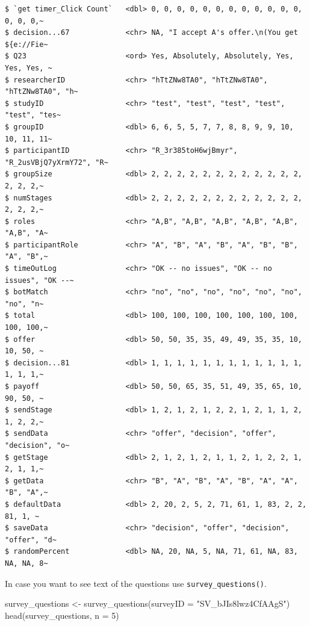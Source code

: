 \documentclass[
  letterpaper,
]{book}
\newenvironment{Shaded}{\begin{snugshade}}{\end{snugshade}}
\newcommand{\AttributeTok}[1]{\textcolor[rgb]{0.40,0.45,0.13}{#1}}
\newcommand{\DecValTok}[1]{\textcolor[rgb]{0.68,0.00,0.00}{#1}}
\newcommand{\FunctionTok}[1]{\textcolor[rgb]{0.28,0.35,0.67}{#1}}
\newcommand{\NormalTok}[1]{\textcolor[rgb]{0.00,0.23,0.31}{#1}}
\newcommand{\OtherTok}[1]{\textcolor[rgb]{0.00,0.23,0.31}{#1}}
\newcommand{\StringTok}[1]{\textcolor[rgb]{0.13,0.47,0.30}{#1}}
\begin{document}
\begin{verbatim}
$ `get timer_Click Count`   <dbl> 0, 0, 0, 0, 0, 0, 0, 0, 0, 0, 0, 0, 0, 0, 0,~
$ decision...67             <chr> NA, "I accept A's offer.\n(You get ${e://Fie~
$ Q23                       <ord> Yes, Absolutely, Absolutely, Yes, Yes, Yes, ~
$ researcherID              <chr> "hTtZNw8TA0", "hTtZNw8TA0", "hTtZNw8TA0", "h~
$ studyID                   <chr> "test", "test", "test", "test", "test", "tes~
$ groupID                   <dbl> 6, 6, 5, 5, 7, 7, 8, 8, 9, 9, 10, 10, 11, 11~
$ participantID             <chr> "R_3r385toH6wjBmyr", "R_2usVBjQ7yXrmY72", "R~
$ groupSize                 <dbl> 2, 2, 2, 2, 2, 2, 2, 2, 2, 2, 2, 2, 2, 2, 2,~
$ numStages                 <dbl> 2, 2, 2, 2, 2, 2, 2, 2, 2, 2, 2, 2, 2, 2, 2,~
$ roles                     <chr> "A,B", "A,B", "A,B", "A,B", "A,B", "A,B", "A~
$ participantRole           <chr> "A", "B", "A", "B", "A", "B", "B", "A", "B",~
$ timeOutLog                <chr> "OK -- no issues", "OK -- no issues", "OK --~
$ botMatch                  <chr> "no", "no", "no", "no", "no", "no", "no", "n~
$ total                     <dbl> 100, 100, 100, 100, 100, 100, 100, 100, 100,~
$ offer                     <dbl> 50, 50, 35, 35, 49, 49, 35, 35, 10, 10, 50, ~
$ decision...81             <dbl> 1, 1, 1, 1, 1, 1, 1, 1, 1, 1, 1, 1, 1, 1, 1,~
$ payoff                    <dbl> 50, 50, 65, 35, 51, 49, 35, 65, 10, 90, 50, ~
$ sendStage                 <dbl> 1, 2, 1, 2, 1, 2, 2, 1, 2, 1, 1, 2, 1, 2, 2,~
$ sendData                  <chr> "offer", "decision", "offer", "decision", "o~
$ getStage                  <dbl> 2, 1, 2, 1, 2, 1, 1, 2, 1, 2, 2, 1, 2, 1, 1,~
$ getData                   <chr> "B", "A", "B", "A", "B", "A", "A", "B", "A",~
$ defaultData               <dbl> 2, 20, 2, 5, 2, 71, 61, 1, 83, 2, 2, 81, 1, ~
$ saveData                  <chr> "decision", "offer", "decision", "offer", "d~
$ randomPercent             <dbl> NA, 20, NA, 5, NA, 71, 61, NA, 83, NA, NA, 8~
\end{verbatim}

In case you want to see text of the questions use
\texttt{survey\_questions()}.

\begin{Shaded}
\begin{Highlighting}[]
\NormalTok{survey\_questions }\OtherTok{\textless{}{-}} \FunctionTok{survey\_questions}\NormalTok{(}\AttributeTok{surveyID =} \StringTok{"SV\_bJIs8lwz4CfAAgS"}\NormalTok{)}
\FunctionTok{head}\NormalTok{(survey\_questions, }\AttributeTok{n =} \DecValTok{5}\NormalTok{)}
\end{Highlighting}
\end{Shaded}
\end{document}
